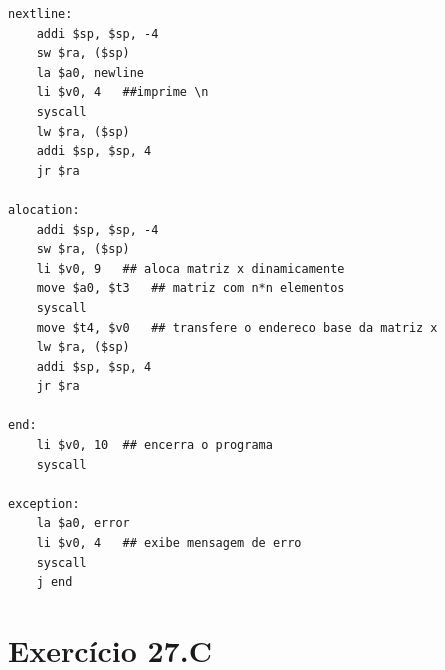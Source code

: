 \documentclass[
	12pt,				%
	oneside,			%
	a4paper,			%
	english,			%
	brazil				%
	]{abntex2ppgsi}
\begin{document}
\begin{lstlisting}[language={[x86masm]Assembler}, caption=Resolução em baixo nível do exercício 27.B]
nextline:
    addi $sp, $sp, -4
    sw $ra, ($sp)
    la $a0, newline
    li $v0, 4   ##imprime \n
    syscall
    lw $ra, ($sp)
    addi $sp, $sp, 4
    jr $ra
	
alocation:
    addi $sp, $sp, -4
    sw $ra, ($sp)
    li $v0, 9   ## aloca matriz x dinamicamente
    move $a0, $t3   ## matriz com n*n elementos
    syscall
    move $t4, $v0	## transfere o endereco base da matriz x
    lw $ra, ($sp)
    addi $sp, $sp, 4
    jr $ra

end:
    li $v0, 10	## encerra o programa
    syscall	

exception:
    la $a0, error
    li $v0, 4	## exibe mensagem de erro
    syscall
    j end		
\end{lstlisting}

\section{Exercício 27.C}
\end{document}
